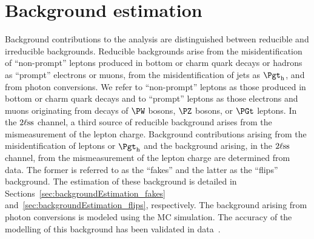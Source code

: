 \section{Background estimation}
\label{sec:backgroundEstimation}

Background contributions to the analysis are distinguished between reducible and irreducible backgrounds.
Reducible backgrounds arise from the misidentification of ``non-prompt'' leptons produced in bottom or charm quark decays or hadrons as ``prompt'' electrons or muons,
from the misidentification of jets as $\tauh$, and from photon conversions.
We refer to ``non-prompt'' leptons as those produced in bottom or charm quark decays 
and to ``prompt'' leptons as those electrons and muons originating from decays of $\PW$ bosons, $\PZ$ bosons, or $\PGt$ leptons.
In the $2\ell\text{ss}$ channel, a third source of reducible background arises from the mismeasurement of the lepton charge.
Background contributions arising from the misidentification of leptons or $\tauh$ and the background arising, in the $2\ell\text{ss}$ channel, 
from the mismeasurement of the lepton charge are determined from data.
The former is referred to as the ``fakes'' and the latter as the ``flips'' background.
The estimation of these background is detailed in Sections~\ref{sec:backgroundEstimation_fakes} and~\ref{sec:backgroundEstimation_flips}, respectively.
The background arising from photon conversions is modeled using the MC simulation.
The accuracy of the modelling of this background has been validated in data~\cite{Sirunyan:2020icl}.

